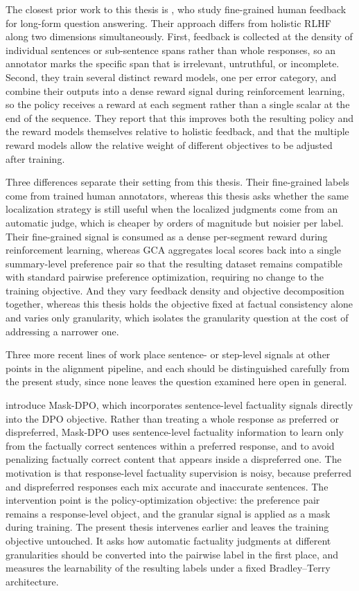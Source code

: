 The closest prior work to this thesis is \citet{wu2023finegrained}, who study
fine-grained human feedback for long-form question answering. Their approach
differs from holistic RLHF along two dimensions simultaneously. First, feedback is
collected at the density of individual sentences or sub-sentence spans rather than
whole responses, so an annotator marks the specific span that is irrelevant,
untruthful, or incomplete. Second, they train several distinct reward models, one
per error category, and combine their outputs into a dense reward signal during
reinforcement learning, so the policy receives a reward at each segment rather than
a single scalar at the end of the sequence. They report that this improves both the
resulting policy and the reward models themselves relative to holistic feedback,
and that the multiple reward models allow the relative weight of different
objectives to be adjusted after training.

Three differences separate their setting from this thesis. Their fine-grained
labels come from trained human annotators, whereas this thesis asks whether the
same localization strategy is still useful when the localized judgments come from
an automatic judge, which is cheaper by orders of magnitude but noisier per label.
Their fine-grained signal is consumed as a dense per-segment reward during
reinforcement learning, whereas GCA aggregates local scores back into a single
summary-level preference pair so that the resulting dataset remains compatible
with standard pairwise preference optimization, requiring no change to the training
objective. And they vary feedback density and objective decomposition together,
whereas this thesis holds the objective fixed at factual consistency alone and
varies only granularity, which isolates the granularity question at the cost of
addressing a narrower one.

Three more recent lines of work place sentence- or step-level signals at
other points in the alignment pipeline, and each should be distinguished
carefully from the present study, since none leaves the question examined
here open in general.

\citet{gu2025maskdpo} introduce Mask-DPO, which incorporates sentence-level
factuality signals directly into the DPO objective. Rather than treating a whole
response as preferred or dispreferred, Mask-DPO uses sentence-level factuality
information to learn only from the factually correct sentences within a preferred
response, and to avoid penalizing factually correct content that appears inside a
dispreferred one. The motivation is that response-level factuality supervision is
noisy, because preferred and dispreferred responses each mix accurate and
inaccurate sentences. The intervention point is the policy-optimization objective:
the preference pair remains a response-level object, and the granular signal is applied as a mask during training. The present thesis intervenes earlier and
leaves the training objective untouched. It asks how automatic factuality
judgments at different granularities should be converted into the pairwise label
in the first place, and measures the learnability of the resulting labels under a
fixed Bradley--Terry architecture.

